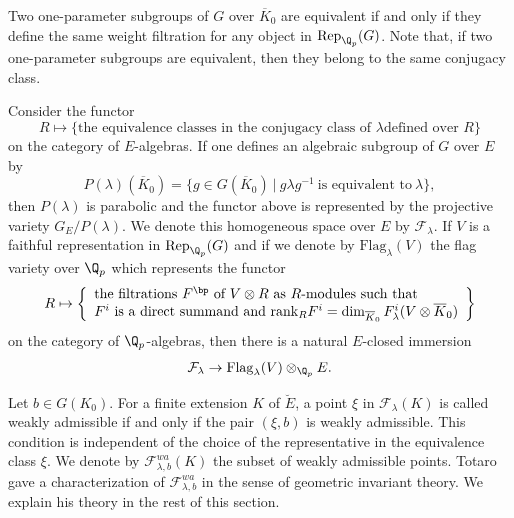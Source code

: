 \begin{apppara}
 Two one-parameter subgroups of $G$
 over $\overline{K}_0$ are equivalent
 if and only if they define the same weight filtration for any object
 in $\mathrm{Rep}_{\Q_p}(G)$.
 Note that, if two one-parameter subgroups are equivalent,
 then they belong to the same conjugacy class.

 Consider the functor
 $$
     R \mapsto
 \{\text{the equivalence classes in the conjugacy class of $\lambda$
 defined over $R$} \}
 $$
 on the category of $E$-algebras. If one defines an algebraic
 subgroup of $G$ over $E$ by
 $$
      P(\lambda)(\overline{K}_0) = \{ g \in G(\overline{K}_0) ~|~
             g \lambda g^{-1}~ \text{is equivalent to}~ \lambda \},
 $$
 then $P(\lambda)$ is parabolic and the functor above is represented by
 the projective variety $G_E/P(\lambda)$.
 We denote this homogeneous space over $E$ by ${\mathcal F}_\lambda$.
 If $V$ is a faithful representation
 in $\mathrm{Rep}_{\Q_p}(G)$
 and if we denote by $\mathrm{Flag}_\lambda(V)$ the flag variety over
 $\Q_p$
 which represents the functor
 $$
     R \mapsto \left\{
            \begin{array}{l}
             \text{the filtrations $F^{\bp}$ of $V \otimes R$
             as $R$-modules such that} \\
             \text{$F^i$ is a direct summand and
             $\mathrm{rank}_R F^i
                = \dim_{\overline{K}_0} F_\lambda^i(V \otimes \overline{K}_0)$}
            \end{array}
         \right\}
 $$
 on the category of $\Q_p$-algebras, then there is
 a natural $E$-closed immersion
 $$
      {\mathcal F}_\lambda
          \rightarrow \mathrm{Flag}_\lambda(V)
 \otimes_{\Q_p} E.
 $$
\end{apppara}

\begin{apppara}
 Let $b \in G(K_0)$.
 For a finite extension $K$ of $\breve{E}$, a point $\xi$
 in ${\mathcal F}_\lambda(K)$ is called weakly admissible if and only if
 the pair $(\xi, b)$ is weakly admissible. This condition is independent
 of the choice of the representative in the equivalence class $\xi$.
 We denote by ${\mathcal F}^{wa}_{\lambda, b}(K)$ the subset of weakly
 admissible points.
 Totaro gave a characterization of ${\mathcal F}^{wa}_{\lambda, b}$
 in the sense of geometric invariant theory. \cite{tpipht}
 We explain his theory in the rest of this section.
\end{apppara}

